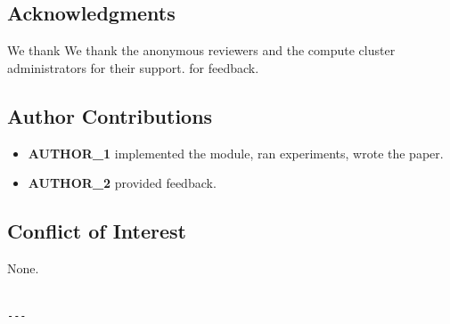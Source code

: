 \subsection{Acknowledgments}

We thank We thank the anonymous reviewers and the compute cluster administrators for their support. for feedback.

\subsection{Author Contributions}

\begin{itemize}
\item \textbf{{{AUTHOR\_1}}} implemented the module, ran experiments, wrote the paper.
\item \textbf{{{AUTHOR\_2}}} provided feedback.

\end{itemize}
\subsection{Conflict of Interest}

None.
\begin{lstlisting}

---
\end{lstlisting}